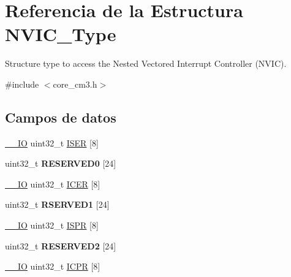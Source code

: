 \hypertarget{struct_n_v_i_c___type}{}\section{Referencia de la Estructura N\+V\+I\+C\+\_\+\+Type}
\label{struct_n_v_i_c___type}


Structure type to access the Nested Vectored Interrupt Controller (N\+V\+IC).  




{\ttfamily \#include $<$core\+\_\+cm3.\+h$>$}

\subsection*{Campos de datos}
\begin{DoxyCompactItemize}
\item 
\mbox{\hyperlink{core__cm3_8h_aec43007d9998a0a0e01faede4133d6be}{\+\_\+\+\_\+\+IO}} uint32\+\_\+t \mbox{\hyperlink{struct_n_v_i_c___type_a0bf79013b539f9f929c75bd50f8ec67d}{I\+S\+ER}} \mbox{[}8\mbox{]}
\item 
\mbox{\label{struct_n_v_i_c___type_ac881b676be4d9659951f43c2fccb34b4}} 
uint32\+\_\+t {\bfseries R\+E\+S\+E\+R\+V\+E\+D0} \mbox{[}24\mbox{]}
\item 
\mbox{\hyperlink{core__cm3_8h_aec43007d9998a0a0e01faede4133d6be}{\+\_\+\+\_\+\+IO}} uint32\+\_\+t \mbox{\hyperlink{struct_n_v_i_c___type_af458bc93cfb899fc1c77c5d1f39dde88}{I\+C\+ER}} \mbox{[}8\mbox{]}
\item 
\mbox{\label{struct_n_v_i_c___type_ab993fe7f0b489b30bc677ccf53426a92}} 
uint32\+\_\+t {\bfseries R\+S\+E\+R\+V\+E\+D1} \mbox{[}24\mbox{]}
\item 
\mbox{\hyperlink{core__cm3_8h_aec43007d9998a0a0e01faede4133d6be}{\+\_\+\+\_\+\+IO}} uint32\+\_\+t \mbox{\hyperlink{struct_n_v_i_c___type_ab39acf254b485e3ad71b18aa9f1ca594}{I\+S\+PR}} \mbox{[}8\mbox{]}
\item 
\mbox{\label{struct_n_v_i_c___type_a86dfd6bf6c297be163d078945f67e8b6}} 
uint32\+\_\+t {\bfseries R\+E\+S\+E\+R\+V\+E\+D2} \mbox{[}24\mbox{]}
\item 
\mbox{\hyperlink{core__cm3_8h_aec43007d9998a0a0e01faede4133d6be}{\+\_\+\+\_\+\+IO}} uint32\+\_\+t \mbox{\hyperlink{struct_n_v_i_c___type_a8165d9a8c0090021e56bbe91c2c44667}{I\+C\+PR}} \mbox{[}8\mbox{]}

\end{DoxyCompactItemize}
